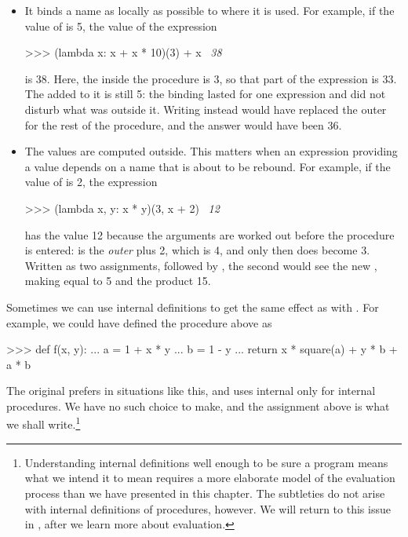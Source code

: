 \begin{itemize}
\item
It binds a name as locally as possible to where it is used.  For example, if
the value of  is 5, the value of the expression

\begin{codeBlock}
>>> (lambda x: x + x * 10)(3) + x
~\textit{38}~
\end{codeBlock}

\noindent
is 38.  Here, the  inside the procedure is 3, so that part of the
expression is 33.  The  added to it is still 5: the binding lasted for
one expression and did not disturb what was outside it.  Writing 
instead would have replaced the outer  for the rest of the procedure,
and the answer would have been 36.

\item
The values are computed outside.  This matters when an expression providing a
value depends on a name that is about to be rebound.  For example, if the value
of  is 2, the expression

\begin{codeBlock}
>>> (lambda x, y: x * y)(3, x + 2)
~\textit{12}~
\end{codeBlock}

\noindent
has the value 12 because the arguments are worked out before the procedure is
entered:  is the \emph{outer}  plus 2, which is 4, and only
then does  become 3.  Written as two assignments, 
followed by , the second would see the new , making
 equal to 5 and the product 15.
\end{itemize}

\noindent
Sometimes we can use internal definitions to get the same effect as with
.  For example, we could have defined the procedure  above as

\begin{codeBlock}
>>> def f(x, y):
...     a = 1 + x * y
...     b = 1 - y
...     return x * square(a) + y * b + a * b
\end{codeBlock}

\noindent
The original prefers  in situations like this, and uses internal
 only for internal procedures.  We have no such choice to make,
and the assignment above is what we shall write.\footnote{Understanding
internal definitions well enough to be sure a program means what we intend it
to mean requires a more elaborate model of the evaluation process than we have
presented in this chapter.  The subtleties do not arise with internal
definitions of procedures, however.  We will return to this issue in
, after we learn more about evaluation.}

